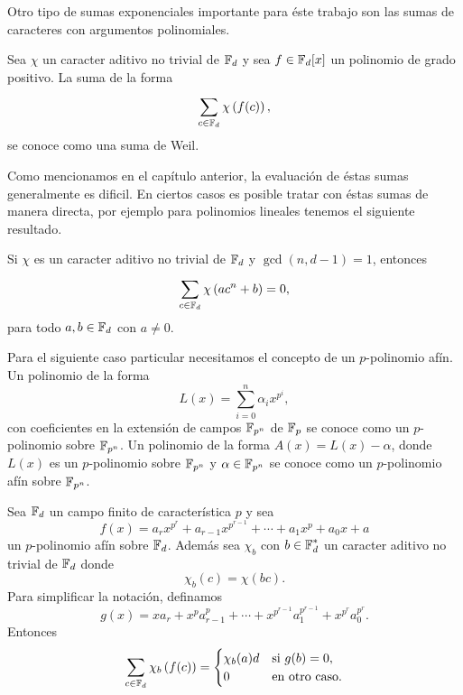 Otro tipo de sumas exponenciales importante para éste
trabajo son las sumas de caracteres con argumentos
polinomiales.
\begin{definition}
  Sea $\chi$ un caracter aditivo no trivial de $\operatorname{\mathbb{F}}_d$ y sea
  $f \in \operatorname{\mathbb{F}}_d[x]$ un polinomio de grado positivo. La suma de
  la forma
  \begin{equation}
    \sum_{c \in \operatorname{\mathbb{F}}_d}^{} \chi\left( f(c) \right),
  \end{equation}
  se conoce como una suma de Weil.
\end{definition} 
Como mencionamos en el capítulo anterior, la evaluación de
éstas sumas generalmente es dificil. En ciertos casos es
posible tratar con éstas sumas de manera directa, por
ejemplo para polinomios lineales tenemos el siguiente
resultado.
\begin{theorem}
  \label{thm:lidl_linear_sum}
  Si $\chi$ es un caracter aditivo no trivial de $\operatorname{\mathbb{F}}_d$ y
  $\gcd(n,d-1) = 1$, entonces
  \begin{equation}
    \sum_{c \in \operatorname{\mathbb{F}}_d}^{} \chi\left( a c^{n} + b \right) 
    = 0,
  \end{equation}
  para todo $a,b \in \operatorname{\mathbb{F}}_d$ con $a \neq 0$.
\end{theorem}
Para el siguiente caso particular necesitamos el concepto de un
$p$-polinomio afín. Un polinomio de la forma
\begin{equation}
  \label{eqn:affine_poly}
  L(x)
  = \sum_{i = 0}^{n} \alpha_i x^{p^{i}},
\end{equation}
con coeficientes en la extensión de campos $\operatorname{\mathbb{F}}_{p^{n}}$ de
$\operatorname{\mathbb{F}}_p$ se conoce como un $p$-polinomio sobre $\operatorname{\mathbb{F}}_{p^{n}}$.
Un polinomio de la forma $A(x) = L(x) - \alpha$, donde
$L(x)$ es un $p$-polinomio sobre $\operatorname{\mathbb{F}}_{p^{n}}$ y $\alpha \in
\operatorname{\mathbb{F}}_{p^{n}}$ se conoce como un $p$-polinomio afín sobre
$\operatorname{\mathbb{F}}_{p^{n}}$.
\begin{theorem}
  \label{thm:lidl_weil_poly}
  Sea $\operatorname{\mathbb{F}}_d$ un campo finito de característica $p$ y sea
  \begin{equation}
    f(x) = a_r x^{p^{r}} + a_{r-1} x^{p^{r-1}} + \cdots +
    a_1 x^{p} + a_0 x + a
  \end{equation}
  un $p$-polinomio afín sobre $\operatorname{\mathbb{F}}_d$. Además sea $\chi_b$
  con $b \in \operatorname{\mathbb{F}}_d^{*}$ un caracter aditivo no trivial de
  $\operatorname{\mathbb{F}}_d$ donde
  \begin{equation}
    \chi_b(c) = \chi(bc).
  \end{equation}
  Para simplificar la notación, definamos 
  \[
    g(x)
    = x a_r + x^{p} a_{r-1}^{p} + \cdots +
    x^{p^{r-1}}a_1^{p^{r-1}} + x^{p^{r}}a_0^{p^{r}}.
  \] 
  Entonces
  \begin{equation}
    \sum_{c \in \operatorname{\mathbb{F}}_d}^{} \chi_b\left( f(c) \right) 
    = 
    \begin{cases}
      \chi_b(a) d & \text{si } g(b) = 0, \\
      0 & \text{en otro caso}.
    \end{cases}
  \end{equation}
\end{theorem}

